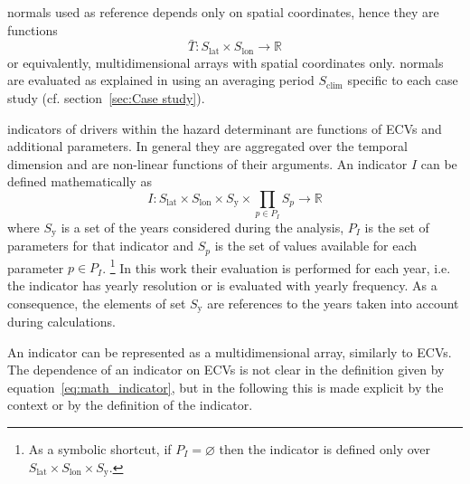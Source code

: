 \Glspl{normal} used as reference depends only on spatial coordinates, hence they are functions
\begin{equation}
  \label{eq:math_normal}
  \bar{T} : S_\text{lat} \times S_\text{lon} \to \mathbb{R}
\end{equation}
or equivalently, multidimensional arrays with spatial coordinates only.
\Glspl{normal} are evaluated as explained in \cite[6]{2017WorldMeteorologicalOrganizationWMOWMOGuidelines} using an averaging period $S_\text{clim}$ specific to each case study (cf. section~\ref{sec:Case study}).

\Glspl{indicator} of \glspl{driver} within the \gls{hazard} \gls{determinant} are functions of \glspl{ECV} and additional parameters. In general they are aggregated over the temporal dimension and are non-linear functions of their arguments.
An \gls{indicator} $I$ can be defined mathematically as
\begin{equation}
  \label{eq:math_indicator}
  I : S_\text{lat} \times S_\text{lon} \times S_\text{y} \times \prod_{p \in P_I} S_p \to \mathbb{R}
\end{equation}
where $S_\text{y}$ is a set of the years considered during the analysis, $P_I$ is the set of parameters for that indicator and $S_p$ is the set of values available for each parameter $p \in P_I$.%
\footnote{As a symbolic shortcut, if $P_I = \varnothing$ then the indicator is defined only over $S_\text{lat} \times S_\text{lon} \times S_\text{y}$.}
In this work their evaluation is performed for each year, i.e. the \gls{indicator} has yearly resolution or is evaluated with yearly frequency. As a consequence, the elements of set $S_\text{y}$ are references to the years taken into account during calculations.

An \gls{indicator} can be represented as a multidimensional array, similarly to \glspl{ECV}.
The dependence of an \gls{indicator} on \glspl{ECV} is not clear in the definition given by equation~\eqref{eq:math_indicator}, but in the following this is made explicit by the context or by the definition of the \gls{indicator}.

